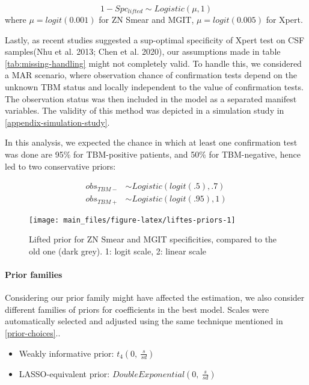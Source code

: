 \documentclass[
]{article}
\begin{document}
\[
1-Spc_{lifted} \sim Logistic(\mu, 1)
\]
where \(\mu = logit(0.001)\) for ZN Smear and MGIT, \(\mu = logit(0.005)\) for Xpert.

Lastly, as recent studies suggested a sup-optimal specificity of Xpert test on CSF samples(Nhu et al. 2013; Chen et al. 2020), our assumptions made in table \ref{tab:missing-handling} might not completely valid. To handle this, we considered a MAR scenario, where observation chance of confirmation tests depend on the unknown TBM status and locally independent to the value of confirmation tests. The observation status was then included in the model as a separated manifest variables. The validity of this method was depicted in a simulation study in \ref{appendix-simulation-study}.

In this analysis, we expected the chance in which at least one confirmation test was done are 95\% for TBM-positive patients, and 50\% for TBM-negative, hence led to two conservative priors:

\[
\begin{aligned}
obs_{TBM-} &\sim Logistic(logit(.5), .7) \\
obs_{TBM+} &\sim Logistic(logit(.95), 1)
\end{aligned}
\]

\begin{figure}

{\centering \texttt{[image: main\_files/figure-latex/liftes-priors-1]} 

}

\caption{Lifted prior for ZN Smear and MGIT specificities, compared to the old one (dark grey). 1: logit scale, 2: linear scale}\label{fig:liftes-priors}
\end{figure}

\hypertarget{prior-families}{%
\paragraph{Prior families}\label{prior-families}}

Considering our prior family might have affected the estimation, we also consider different families of priors for coefficients in the best model. Scales were automatically selected and adjusted using the same technique mentioned in \ref{prior-choices}..

\begin{itemize}
\item
  Weakly informative prior: \(t_4(0,\ \frac{s}{sd})\)
\item
  LASSO-equivalent prior: \(DoubleExponential(0,\ \frac{s}{sd})\)
\end{itemize}
\end{document}
